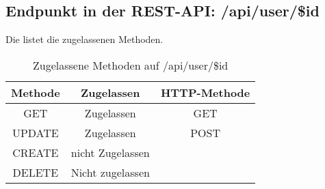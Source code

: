 \subsection{Endpunkt in der REST-API: /api/user/\$id}
Die  listet die zugelassenen Methoden. 

\begin{table}[!htbp]
	\begin{tabular}{|c|c|c|}
		\hline
			\textbf{Methode} & \textbf{Zugelassen} & \textbf{HTTP-Methode} \\ \hline
			GET & Zugelassen & GET \\ \hline
			UPDATE & Zugelassen & POST \\ \hline 
			CREATE & nicht Zugelassen & \\ \hline  
			DELETE & Nicht zugelassen & \\ \hline
	\end{tabular}

		\caption{Zugelassene Methoden auf /api/user/\$id}
		\label{tab:end:rest:api:user:id:meth}
\end{table}